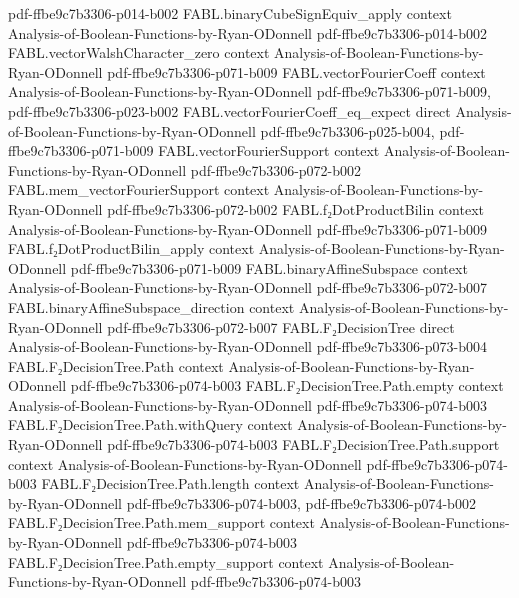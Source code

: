\begin{theorem}
  {pdf-ffbe9c7b3306-p014-b002}
\proofstep
  {FABL.binaryCubeSignEquiv_apply}
  {context}
  {Analysis-of-Boolean-Functions-by-Ryan-ODonnell}
  {pdf-ffbe9c7b3306-p014-b002}
\proofstep
  {FABL.vectorWalshCharacter_zero}
  {context}
  {Analysis-of-Boolean-Functions-by-Ryan-ODonnell}
  {pdf-ffbe9c7b3306-p071-b009}
\proofstep
  {FABL.vectorFourierCoeff}
  {context}
  {Analysis-of-Boolean-Functions-by-Ryan-ODonnell}
  {pdf-ffbe9c7b3306-p071-b009,
    pdf-ffbe9c7b3306-p023-b002}
\proofstep
  {FABL.vectorFourierCoeff_eq_expect}
  {direct}
  {Analysis-of-Boolean-Functions-by-Ryan-ODonnell}
  {pdf-ffbe9c7b3306-p025-b004,
    pdf-ffbe9c7b3306-p071-b009}
\proofstep
  {FABL.vectorFourierSupport}
  {context}
  {Analysis-of-Boolean-Functions-by-Ryan-ODonnell}
  {pdf-ffbe9c7b3306-p072-b002}
\proofstep
  {FABL.mem_vectorFourierSupport}
  {context}
  {Analysis-of-Boolean-Functions-by-Ryan-ODonnell}
  {pdf-ffbe9c7b3306-p072-b002}
\proofstep
  {FABL.f₂DotProductBilin}
  {context}
  {Analysis-of-Boolean-Functions-by-Ryan-ODonnell}
  {pdf-ffbe9c7b3306-p071-b009}
\proofstep
  {FABL.f₂DotProductBilin_apply}
  {context}
  {Analysis-of-Boolean-Functions-by-Ryan-ODonnell}
  {pdf-ffbe9c7b3306-p071-b009}
\proofstep
  {FABL.binaryAffineSubspace}
  {context}
  {Analysis-of-Boolean-Functions-by-Ryan-ODonnell}
  {pdf-ffbe9c7b3306-p072-b007}
\proofstep
  {FABL.binaryAffineSubspace_direction}
  {context}
  {Analysis-of-Boolean-Functions-by-Ryan-ODonnell}
  {pdf-ffbe9c7b3306-p072-b007}
\proofstep
  {FABL.F₂DecisionTree}
  {direct}
  {Analysis-of-Boolean-Functions-by-Ryan-ODonnell}
  {pdf-ffbe9c7b3306-p073-b004}
\proofstep
  {FABL.F₂DecisionTree.Path}
  {context}
  {Analysis-of-Boolean-Functions-by-Ryan-ODonnell}
  {pdf-ffbe9c7b3306-p074-b003}
\proofstep
  {FABL.F₂DecisionTree.Path.empty}
  {context}
  {Analysis-of-Boolean-Functions-by-Ryan-ODonnell}
  {pdf-ffbe9c7b3306-p074-b003}
\proofstep
  {FABL.F₂DecisionTree.Path.withQuery}
  {context}
  {Analysis-of-Boolean-Functions-by-Ryan-ODonnell}
  {pdf-ffbe9c7b3306-p074-b003}
\proofstep
  {FABL.F₂DecisionTree.Path.support}
  {context}
  {Analysis-of-Boolean-Functions-by-Ryan-ODonnell}
  {pdf-ffbe9c7b3306-p074-b003}
\proofstep
  {FABL.F₂DecisionTree.Path.length}
  {context}
  {Analysis-of-Boolean-Functions-by-Ryan-ODonnell}
  {pdf-ffbe9c7b3306-p074-b003,
    pdf-ffbe9c7b3306-p074-b002}
\proofstep
  {FABL.F₂DecisionTree.Path.mem_support}
  {context}
  {Analysis-of-Boolean-Functions-by-Ryan-ODonnell}
  {pdf-ffbe9c7b3306-p074-b003}
\proofstep
  {FABL.F₂DecisionTree.Path.empty_support}
  {context}
  {Analysis-of-Boolean-Functions-by-Ryan-ODonnell}
  {pdf-ffbe9c7b3306-p074-b003}

\end{theorem}
